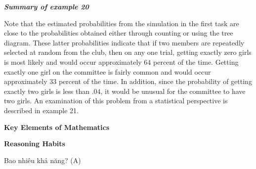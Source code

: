 {    \textbf{\emph{Summary of example 20}}

    Note that the estimated probabilities from the simulation in the first task are close to the probabilities obtained either through counting or using the tree diagram. These latter probabilities indicate that if two members are repeatedly selected at random from the club, then on any one trial, getting exactly zero girls is most likely and would occur approximately $64$ percent of the time. Getting exactly one girl on the committee is fairly common and would occur approximately $33$ percent of the time. In addition, since the probability of getting exactly two girls is less than $.04$, it would be unusual for the committee to have two girls. An examination of this problem from a statistical perspective is described in example 21.

    \textbf{Key Elements of Mathematics}

    \begin{hanglist}

    \end{hanglist}

    \textbf{Reasoning Habits}

    \begin{hanglist}



    \end{hanglist}
  }
  {
    Bao nhiêu khả năng? (A)
  }

